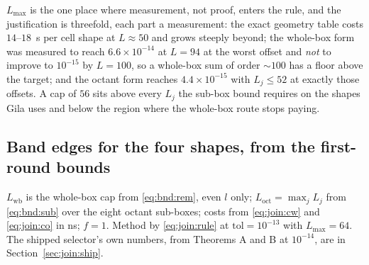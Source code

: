 $L_{\max}$ is the one place where measurement, not proof, enters the rule, and the
justification is threefold, each part a measurement: the exact geometry table costs
$14$--$18$~s per cell shape at $L \approx 50$ and grows steeply beyond; the whole-box
form was measured to reach $6.6\times10^{-14}$ at $L = 94$ at the worst offset and
\emph{not} to improve to $10^{-15}$ by $L = 100$, so a whole-box sum of order
$\sim\!100$ has a  floor above the target; and the octant form reaches
$4.4\times10^{-15}$ with $L_j \le 52$ at exactly those offsets. A cap of $56$ sits above
every $L_j$ the sub-box bound requires on the shapes Gila uses and below the region where
the whole-box route stops paying.

\subsection{Band edges for the four shapes, from the first-round bounds}
\label{sec:join:bands}

$L_{\mathrm{wb}}$ is the whole-box cap from \eqref{eq:bnd:rem}, even $l$ only;
$L_{\mathrm{oct}} = \max_j L_j$ from \eqref{eq:bnd:sub} over the eight octant sub-boxes;
costs from \eqref{eq:join:cw} and \eqref{eq:join:co} in ns; $f = 1$. Method by
\eqref{eq:join:rule} at $\mathrm{tol} = 10^{-13}$ with $L_{\max} = 64$. The shipped
selector's own numbers, from Theorems A and B at $10^{-14}$, are in
Section~\ref{sec:join:ship}.

